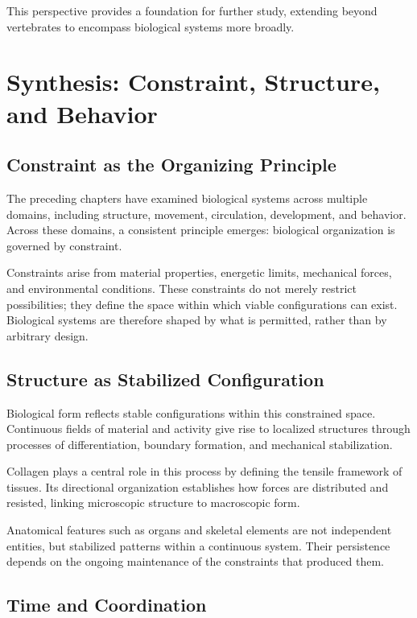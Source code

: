 \documentclass[11pt,oneside]{book}
\begin{document}
This perspective provides a foundation for further study, extending beyond vertebrates to encompass biological systems more broadly.

\chapter{Synthesis: Constraint, Structure, and Behavior}

\section{Constraint as the Organizing Principle}

The preceding chapters have examined biological systems across multiple domains, including structure, movement, circulation, development, and behavior. Across these domains, a consistent principle emerges: biological organization is governed by constraint.

Constraints arise from material properties, energetic limits, mechanical forces, and environmental conditions. These constraints do not merely restrict possibilities; they define the space within which viable configurations can exist. Biological systems are therefore shaped by what is permitted, rather than by arbitrary design.

\section{Structure as Stabilized Configuration}

Biological form reflects stable configurations within this constrained space. Continuous fields of material and activity give rise to localized structures through processes of differentiation, boundary formation, and mechanical stabilization.

Collagen plays a central role in this process by defining the tensile framework of tissues. Its directional organization establishes how forces are distributed and resisted, linking microscopic structure to macroscopic form.

Anatomical features such as organs and skeletal elements are not independent entities, but stabilized patterns within a continuous system. Their persistence depends on the ongoing maintenance of the constraints that produced them.

\section{Time and Coordination}
\end{document}
